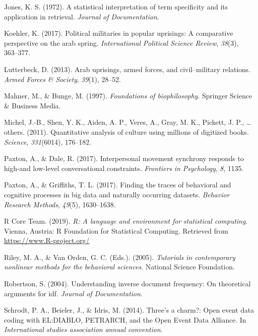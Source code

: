 \documentclass[english,man]{apa6}
\begin{document}
\leavevmode\hypertarget{ref-jones1972statistical}{}%
Jones, K. S. (1972). A statistical interpretation of term specificity and its application in retrieval. \emph{Journal of Documentation}.

\leavevmode\hypertarget{ref-koehler2017political}{}%
Koehler, K. (2017). Political militaries in popular uprisings: A comparative perspective on the arab spring. \emph{International Political Science Review}, \emph{38}(3), 363--377.

\leavevmode\hypertarget{ref-lutterbeck2013arab}{}%
Lutterbeck, D. (2013). Arab uprisings, armed forces, and civil--military relations. \emph{Armed Forces \& Society}, \emph{39}(1), 28--52.

\leavevmode\hypertarget{ref-mahner1997foundations}{}%
Mahner, M., \& Bunge, M. (1997). \emph{Foundations of biophilosophy}. Springer Science \& Business Media.

\leavevmode\hypertarget{ref-michel2011quantitative}{}%
Michel, J.-B., Shen, Y. K., Aiden, A. P., Veres, A., Gray, M. K., Pickett, J. P., \ldots{} others. (2011). Quantitative analysis of culture using millions of digitized books. \emph{Science}, \emph{331}(6014), 176--182.

\leavevmode\hypertarget{ref-paxton2017interpersonal}{}%
Paxton, A., \& Dale, R. (2017). Interpersonal movement synchrony responds to high-and low-level conversational constraints. \emph{Frontiers in Psychology}, \emph{8}, 1135.

\leavevmode\hypertarget{ref-paxton2017finding}{}%
Paxton, A., \& Griffiths, T. L. (2017). Finding the traces of behavioral and cognitive processes in big data and naturally occurring datasets. \emph{Behavior Research Methods}, \emph{49}(5), 1630--1638.

\leavevmode\hypertarget{ref-R-base}{}%
R Core Team. (2019). \emph{R: A language and environment for statistical computing}. Vienna, Austria: R Foundation for Statistical Computing. Retrieved from \url{https://www.R-project.org/}

\leavevmode\hypertarget{ref-riley2005tutorials}{}%
Riley, M. A., \& Van Orden, G. C. (Eds.). (2005). \emph{Tutorials in contemporary nonlinear methods for the behavioral sciences}. National Science Foundation.

\leavevmode\hypertarget{ref-robertson2004understanding}{}%
Robertson, S. (2004). Understanding inverse document frequency: On theoretical arguments for idf. \emph{Journal of Documentation}.

\leavevmode\hypertarget{ref-schrodt2014three}{}%
Schrodt, P. A., Beieler, J., \& Idris, M. (2014). Three's a charm?: Open event data coding with EL:DIABLO, PETRARCH, and the Open Event Data Alliance. In \emph{International studies association annual convention}.
\end{document}
